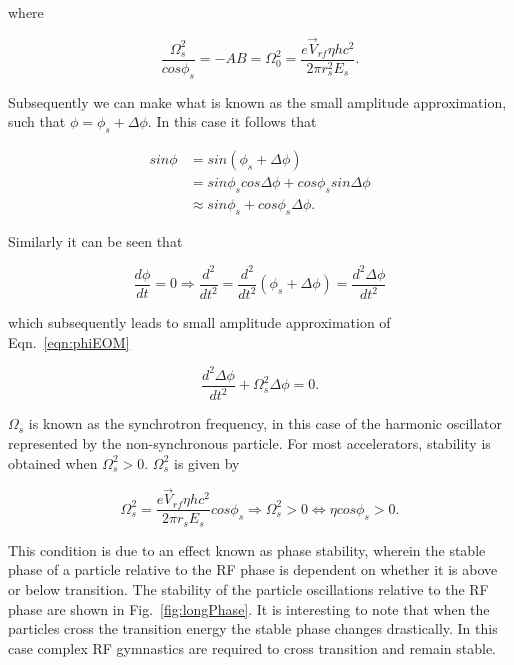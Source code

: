 where 

\begin{equation}
\frac{\Omega_{s}^{2}}{cos\phi_{s}} = -AB = \Omega_{0}^{2} = \frac{e\vec{V}_{rf}\eta hc^{2}}{2\pi r_{s}^{2}E_{s}}.
\end{equation}

Subsequently we can make what is known as the small amplitude approximation, such that $\phi = \phi_{s} + \Delta \phi$. In this case it follows that

\begin{align}
sin \phi &= sin \left( \phi_{s} + \Delta \phi \right) \\
&= sin\phi_{s}cos\Delta \phi + cos\phi_{s} sin \Delta \phi \\
& \approx sin\phi_{s} + cos \phi_{s} \Delta \phi.
\end{align}

Similarly it can be seen that

\begin{equation}
\frac{d\phi}{dt} = 0 \Rightarrow \frac{d^{2}}{dt^{2}} = \frac{d^{2}}{dt^{2}}\left( \phi_{s} + \Delta \phi \right) = \frac{d^{2}\Delta \phi}{dt^{2}}
\end{equation}

which subsequently leads to small amplitude approximation of Eqn.~\ref{eqn:phiEOM}

\begin{equation}
\frac{d^{2}\Delta \phi}{dt^{2}} + \Omega_{s}^{2}\Delta \phi = 0.
\end{equation}

$\Omega_{s}$ is known as the synchrotron frequency, in this case of the harmonic oscillator represented by the non-synchronous particle. For most accelerators, stability is obtained when $\Omega_{s}^{2} > 0$. $\Omega_{s}^{2}$ is given by

\begin{equation}
\Omega_{s}^{2} = \frac{e\vec{V}_{rf}\eta hc^{2}}{2\pi r_{s} E_{s}} cos \phi_{s} \Rightarrow \Omega_{s}^{2} > 0 \Leftrightarrow \eta cos\phi_{s} > 0.
\end{equation}

This condition is due to an effect known as phase stability, wherein the stable phase of a particle relative to the RF phase is dependent on whether it is above or below transition. The stability of the particle oscillations relative to the RF phase are shown in Fig.~\ref{fig:longPhase}. It is interesting to note that when the particles cross the transition energy the stable phase changes drastically. In this case complex RF gymnastics are required to cross transition and remain stable.

